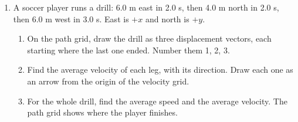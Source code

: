\documentclass[12pt, twoside]{article}
\begin{document}
\begin{enumerate}[itemsep=0.5cm]
\item A soccer player runs a drill: 6.0 m east in 2.0 s, then 4.0 m north in 2.0 s,
  then 6.0 m west in 3.0 s. East is $+x$ and north is $+y$.

  \begin{minipage}[t]{0.56\linewidth}
    \vspace{0pt}
    \begin{enumerate}[itemsep=1.3cm]
      \item On the path grid, draw the drill as three displacement vectors, each
        starting where the last one ended. Number them 1, 2, 3.
      \item Find the average velocity of each leg, with its direction. Draw each one
        as an arrow from the origin of the velocity grid.
      \item For the whole drill, find the average speed and the average velocity.
        The path grid shows where the player finishes.
    \end{enumerate}
  \end{minipage}
  \hfill
  \begin{minipage}[t]{0.4\linewidth}
    \vspace{0pt}
    \centering

    \vspace{0.15cm}
  \end{minipage}

\end{enumerate}
\end{document}
